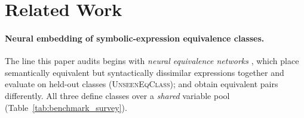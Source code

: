 \section{Related Work}
\label{sec:related}

\paragraph{Neural embedding of symbolic-expression equivalence classes.} The line this paper audits begins with \emph{neural equivalence networks} \citep{allamanis2017learning}, which place semantically equivalent but syntactically dissimilar expressions together and evaluate on held-out classes (\textsc{UnseenEqClass}); \citet{gangwar2023semantic} and \citet{zheng2025egen} obtain equivalent pairs differently. All three define classes over a \emph{shared} variable pool (Table~\ref{tab:benchmark_survey}).

